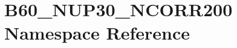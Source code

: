 \hypertarget{namespace_b60___n_u_p30___n_c_o_r_r200}{}\section{B60\+\_\+\+N\+U\+P30\+\_\+\+N\+C\+O\+R\+R200 Namespace Reference}
\label{namespace_b60___n_u_p30___n_c_o_r_r200}
